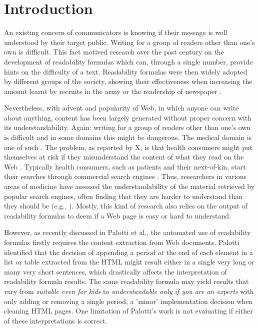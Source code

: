 
\section{Introduction}
\label{chp:understanding_understandability}

An existing concern of communicators is knowing if their message is well understood by their target public.  
Writing for a group of readers other than one's own is difficult.
This fact motived research over the past century on the development of readability formulas which can, through a single number, provide hints on the difficulty of a text.
Readability formulas were then widely adopted by different groups of the society, showing their effectiveness when increasing the amount learnt by recruits in the army \cite{klare55} or the readership of newspaper \cite{perry54}.

Nevertheless, with advent and popularity of Web, in which anyone can write about anything, content has been largely generated without proper concern with its understandability.
Again: writing for a group of readers other than one's own is difficult and in some domains this might be dangerous.
The medical domain is one of such \cite{}.
The problem, as reported by X, is that health consumers might put themselves at risk if they misunderstand the content of what they read on the Web \cite{}.
Typically health consumers, such as patients and their next-of-kin, start their searches through commercial search engines \cite{}.
Thus, researchers in various areas of medicine have assessed the understandability of the material retrieved by popular search engines, often finding that they are harder to understand than they should be (e.g., \cite{graber99readability,fitzsimmons2010readability,wiener2013readability,patel13readability,atcherson14readability,meillier17readability}).
Mostly, this kind of research also relies on the output of readability formulas to deem if a Web page is easy or hard to understand.

However, as recently discussed in Palotti et al.\cite{palotti15}, the automated use of readability formulas firstly requires the content extraction from Web documents.
Palotti identified that the decision of appending a period at the end of each element in a list or table extracted from the HTML might result either in a single very long or many very short sentences, 
which drastically affects the interpretation of readability formula results. The same readability formula may yield results that vary from \textit{suitable even for kids} to \textit{understandable only if you are an experts} with only adding or removing a single period, a 'minor' implementation decision when cleaning HTML pages. 
One limitation of Palotti's work is not evaluating if either of these interpretations is correct.

